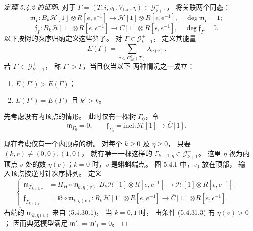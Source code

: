 \begin{proof}[定理 5.4.2 的证明]
对于
$\Gamma=(T,i,v_0,V_{\mathrm{tad}},\eta)
\in\mathcal G_{k+1}^+$，
将关联两个同态：
\begin{equation}
\mathfrak m_\Gamma\colon
B_k\mathcal H[1]\otimes R[e,e^{-1}]
\longrightarrow\mathcal H[1]\otimes R[e,e^{-1}],
\quad\deg\mathfrak m_\Gamma=1;
\tag{5.4.32.1}\label{eq:5-4-32-1}
\end{equation}
\begin{equation}
\mathfrak f_\Gamma\colon
B_k\mathcal H[1]\otimes R[e,e^{-1}]
\longrightarrow\overline C[1]\otimes R[e,e^{-1}],
\quad\deg\mathfrak f_\Gamma=0.
\tag{5.4.32.2}\label{eq:5-4-32-2}
\end{equation}
以下按树的次序归纳定义这些算子。
对 $\Gamma\in\mathcal G_{k+1}^+$，
定义其能量
\[
E(\Gamma)=
\sum_{v\in C^0_{\mathrm{int}}(T)}\lambda_{\eta(v)}.
\]
若 $\Gamma'\in\mathcal G_{k'+1}^+$，
称 $\Gamma'>\Gamma$，当且仅当以下
两种情况之一成立：
\begin{enumerate}
\item[\textup{(5.4.33.1)}]\label{cond:5-4-33-1}
$E(\Gamma')>E(\Gamma)$；
\item[\textup{(5.4.33.2)}]\label{cond:5-4-33-2}
$E(\Gamma')=E(\Gamma)$ 且 $k'>k$。
\end{enumerate}

先考虑没有内顶点的情形。
此时仅有一棵树 $\Gamma_0$，令
\[
\mathfrak m_{\Gamma_0}=0,
\qquad
\mathfrak f_{\Gamma_0}=
\mathrm{incl}\colon\mathcal H[1]\to\overline C[1].
\]

现在考虑仅有一个内顶点的树。
对每个 $k\geq0$ 及 $\eta\geq0$，
只要 $(k,\eta)\ne(0,0),(1,0)$，
就有唯一一棵这样的
$\Gamma_{k+1,\eta}\in\mathcal G_{k+1}^+$。
这里 $\eta$ 视为内顶点 $v$ 处的数
$\eta(v)$；$k=0$ 时，$v$ 是蝌蚪端点。
图 5.4.1 中，$v_0$ 放在顶部，
输入顶点按逆时针次序排列。
定义
\begin{equation}
\left\{\begin{aligned}
\mathfrak m_{\Gamma_{k+1,\eta}}
&=\Pi_H\circ\mathfrak m_{k,\eta(v)}
\colon B_k\mathcal H[1]\otimes R[e,e^{-1}]
\longrightarrow\mathcal H[1]\otimes R[e,e^{-1}],\\
\mathfrak f_{\Gamma_{k+1,\eta}}
&=\mathfrak G\circ\mathfrak m_{k,\eta(v)}
\colon B_k\mathcal H[1]\otimes R[e,e^{-1}]
\longrightarrow\overline C[1]\otimes R[e,e^{-1}].
\end{aligned}\right.
\tag{5.4.34}\label{eq:5-4-34}
\end{equation}
右端的 $\mathfrak m_{k,\eta(v)}$
来自 (5.4.30.1)。
当 $k=0,1$ 时，
由条件 (5.4.31.3) 有 $\eta(v)>0$；
因而典范模型满足
$\overline{\mathfrak m}'_0
=\overline{\mathfrak m}'_1=0$。


\end{proof}
